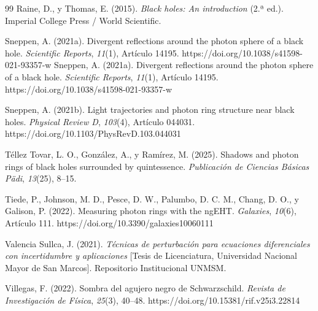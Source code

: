 \documentclass[twoside,onehalfspace]{./Portada/unmsmtesis}
\begin{document}
\begin{thebibliography}{99}
 Raine, D., y Thomas, E. (2015). \textit{Black holes: An introduction} (2.ª ed.). Imperial College Press / World Scientific.

 Sneppen, A. (2021a). Divergent reflections around the photon sphere of a black hole. \textit{Scientific Reports}, \textit{11}(1), Artículo 14195. https://doi.org/10.1038/s41598-021-93357-w
 Sneppen, A. (2021a). Divergent reflections around the photon sphere of a black hole. \textit{Scientific Reports}, \textit{11}(1), Artículo 14195. https://doi.org/10.1038/s41598-021-93357-w

 Sneppen, A. (2021b). Light trajectories and photon ring structure near black holes. \textit{Physical Review D}, \textit{103}(4), Artículo 044031. https://doi.org/10.1103/PhysRevD.103.044031

 Téllez Tovar, L. O., González, A., y Ramírez, M. (2025). Shadows and photon rings of black holes surrounded by quintessence. \textit{Publicación de Ciencias Básicas Pädi}, \textit{13}(25), 8–15.

 Tiede, P., Johnson, M. D., Pesce, D. W., Palumbo, D. C. M., Chang, D. O., y Galison, P. (2022). Measuring photon rings with the ngEHT. \textit{Galaxies}, \textit{10}(6), Artículo 111. https://doi.org/10.3390/galaxies10060111

 Valencia Sullca, J. (2021). \textit{Técnicas de perturbación para ecuaciones diferenciales con incertidumbre y aplicaciones} [Tesis de Licenciatura, Universidad Nacional Mayor de San Marcos]. Repositorio Institucional UNMSM.

 Villegas, F. (2022). Sombra del agujero negro de Schwarzschild. \textit{Revista de Investigación de Física}, \textit{25}(3), 40–48. https://doi.org/10.15381/rif.v25i3.22814

\end{thebibliography}




\end{document}
